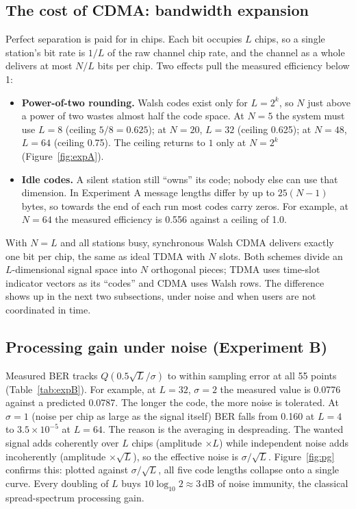 \documentclass[11pt]{article}
\begin{document}
\subsection{The cost of CDMA: bandwidth expansion}
Perfect separation is paid for in chips. Each bit occupies $L$ chips, so a single station's
bit rate is $1/L$ of the raw channel chip rate, and the channel as a whole delivers at most
$N/L$ bits per chip. Two effects pull the measured efficiency below 1:
\begin{itemize}[leftmargin=1.6em]
  \item \textbf{Power-of-two rounding.} Walsh codes exist only for $L=2^k$, so $N$ just
  above a power of two wastes almost half the code space. At $N=5$ the system must use
  $L=8$ (ceiling $5/8=0.625$); at $N=20$, $L=32$ (ceiling 0.625); at $N=48$, $L=64$
  (ceiling 0.75). The ceiling returns to $1$ only at $N=2^k$ (Figure~\ref{fig:expA}).
  \item \textbf{Idle codes.} A silent station still ``owns'' its code; nobody else can use
  that dimension. In Experiment A message lengths differ by up to $25(N-1)$ bytes, so
  towards the end of each run most codes carry zeros. For example, at $N=64$ the measured
  efficiency is 0.556 against a ceiling of 1.0.
\end{itemize}
With $N=L$ and all stations busy, synchronous Walsh CDMA delivers exactly one bit per chip,
the same as ideal TDMA with $N$ slots. Both schemes divide an $L$-dimensional signal space
into $N$ orthogonal pieces; TDMA uses time-slot indicator vectors as its ``codes'' and CDMA
uses Walsh rows. The difference shows up in the next two subsections, under noise and when
users are not coordinated in time.

\subsection{Processing gain under noise (Experiment B)}
Measured BER tracks $Q(0.5\sqrt{L}/\sigma)$ to within sampling error at all 55 points
(Table~\ref{tab:expB}). For example, at $L=32$, $\sigma=2$ the measured value is 0.0776
against a predicted 0.0787. The longer the code, the more noise is tolerated. At $\sigma=1$
(noise per chip as large as the signal itself) BER falls from 0.160 at $L=4$ to
$3.5\times10^{-5}$ at $L=64$. The reason is the averaging in despreading. The wanted signal
adds coherently over $L$ chips (amplitude $\times L$) while independent noise adds
incoherently (amplitude $\times\sqrt{L}$), so the effective noise is $\sigma/\sqrt{L}$.
Figure~\ref{fig:pg} confirms this: plotted against $\sigma/\sqrt{L}$, all five code lengths
collapse onto a single curve. Every doubling of $L$ buys
$10\log_{10}2 \approx 3$\,dB of noise immunity, the classical spread-spectrum processing
gain.
\end{document}
